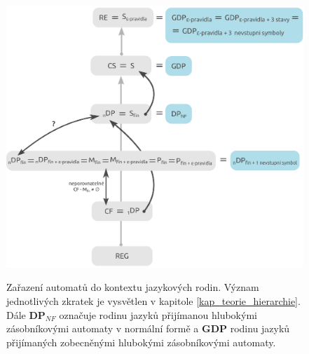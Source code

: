 \begin{figure}[ht]
\centering
\includegraphics{img/bp_hierarchy03.eps} \bigskip \\
\caption{Zařazení automatů do kontextu jazykových rodin. Význam jednotlivých zkratek je vysvětlen v kapitole \ref{kap_teorie_hierarchie}. Dále \textbf{DP${}_{NF}$} označuje rodinu jazyků přijímanou hlubokými zásobníkovými automaty v normální formě a \textbf{GDP} rodinu jazyků přijímaných zobecněnými hlubokými zásobníkovými automaty.}
\label{obr_model_hierarchy}
\end{figure}



